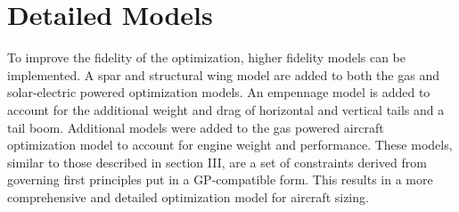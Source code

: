 \documentclass[]{aiaa-tc}%
\begin{document}
% 
% 

\section{Detailed Models}

To improve the fidelity of the optimization, higher fidelity models can be implemented.  
A spar and structural wing model are added to both the gas and solar-electric powered optimization models.  
An empennage model is added to account for the additional weight and drag of horizontal and vertical tails and a tail boom.  
Additional models were added to the gas powered aircraft optimization model to account for engine weight and performance. 
These models, similar to those described in section III, are a set of constraints derived from governing first principles put in a GP-compatible form. 
This results in a more comprehensive and detailed optimization model for aircraft sizing.   \\
\end{document}
